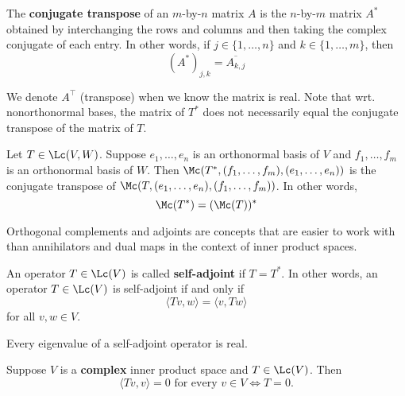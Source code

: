 \documentclass{extarticle}
\begin{document}
\begin{definition}
    The \textbf{conjugate transpose} of an \(m\)-by-\(n\) matrix \(A\) is the \(n\)-by-\(m\) matrix
    \(A^*\) obtained by interchanging the rows and columns and then taking the complex conjugate
    of each entry. In other words, if \(j \in \{1, \ldots, n\}\) and \(k \in \{1, \ldots, m\}\),
    then
    \[(A^*)_{j, k} = \overline{A_{k, j}}\]
\end{definition}

\begin{remark}
    We denote \(A^\top\) (transpose) when we know the matrix is real. Note that wrt. nonorthonormal
    bases, the matrix of \(T^*\) does not necessarily equal the conjugate transpose of the matrix
    of \(T\).
\end{remark}

\begin{thm}
    Let \(T \in \Lc(V, W)\). Suppose \(e_1, \ldots, e_n\) is an orthonormal basis of \(V\) and
    \(f_1, \ldots, f_m\) is an orthonormal basis of \(W\). Then \(\Mc(T^*, (f_1, \ldots, f_m),
    (e_1, \ldots, e_n))\) is the conjugate transpose of \(\Mc(T, (e_1, \ldots, e_n), (f_1, \ldots, f_m))\).
    In other words,
    \[\Mc(T^*) = (\Mc(T))^*\]
\end{thm}

\begin{remark}
    Orthogonal complements and adjoints are concepts that are easier to work with than
    annihilators and dual maps in the context of inner product spaces.
\end{remark}

\begin{definition}
    An operator \( T \in \Lc(V)\) is called \textbf{self-adjoint} if \(T = T^*\). In other words,
    an operator \(T \in \Lc(V)\) is self-adjoint if and only if
    \[\langle Tv,w \rangle = \langle v,Tw \rangle\]
    for all \(v, w \in V\).
\end{definition}

\begin{corollary}
    Every eigenvalue of a self-adjoint operator is real.
\end{corollary}

\begin{corollary}
    Suppose \(V\) is a \textbf{complex} inner product space and \(T \in \Lc(V)\). Then
    \[\langle Tv,v \rangle = 0 \text{ for every } v \in V \Longleftrightarrow T = 0.\]
\end{corollary}
\end{document}
